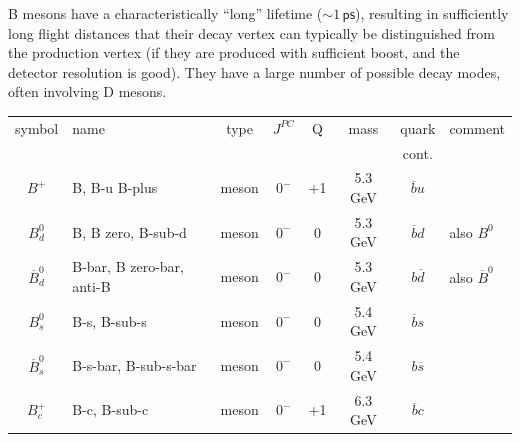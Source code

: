 B mesons have a characteristically ``long'' lifetime ($\sim
1\,\mathsf{ps}$), resulting in sufficiently long flight distances that
their decay vertex can typically be distinguished from the production
vertex (if they are produced with sufficient boost, and the detector
resolution is good). They
have a large number of possible decay modes, often involving D mesons.\\
\begin{tabular}{|| c| p{2cm}| *{5}{c|} p{2.7cm} ||}
\hline\hline
 symbol & name & type &  $J^{PC}$ & Q & mass & quark & comment\\
        &      &      &           &   &      & cont. &
\\\hline\hline
 $B^+$    & B, B-u B-plus & meson & $0^{-}$ & +1 & 5.3 GeV &
 $\overline{b}u$ & 
\\\hline
 $B^0_d$    & B, B zero, B-sub-d & meson & $0^{-}$ & 0 & 5.3 GeV &
 $\overline{b}d$ &  also $B^0$
\\\hline
 $\overline{B}^0_d$    & B-bar, B zero-bar, anti-B & meson & $0^{-}$ & 0 & 5.3 GeV &
 ${b}\overline{d}$ & also $\overline{B}^0$
\\\hline
 $B^0_s$    & B-s, B-sub-s & meson & $0^{-}$ & 0 & 5.4 GeV &
 $\overline{b}s$ & 
\\\hline
 $\overline{B}^0_s$  & B-s-bar, B-sub-s-bar & meson & $0^{-}$ & 0 & 5.4 GeV &
 ${b}\overline{s}$ & 
\\\hline
 $B^{+}_c$    & B-c, B-sub-c & meson & $0^{-}$ & +1 & 6.3 GeV &
 $\overline{b}c$ & 
\\\hline
\end{tabular}

